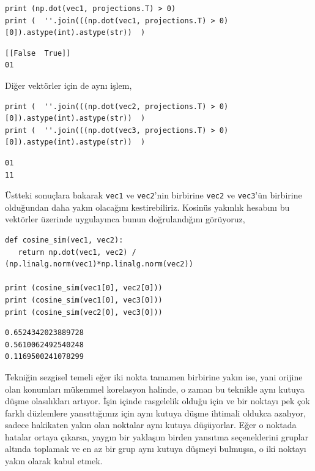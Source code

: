 \documentclass[12pt,fleqn]{article}\usepackage{../../common}
\begin{document}
\begin{verbatim}
print (np.dot(vec1, projections.T) > 0)
print (  ''.join(((np.dot(vec1, projections.T) > 0)[0]).astype(int).astype(str))  )
\end{verbatim}

\begin{verbatim}
[[False  True]]
01
\end{verbatim}

Diğer vektörler için de aynı işlem,

\begin{verbatim}
print (  ''.join(((np.dot(vec2, projections.T) > 0)[0]).astype(int).astype(str))  )
print (  ''.join(((np.dot(vec3, projections.T) > 0)[0]).astype(int).astype(str))  )
\end{verbatim}

\begin{verbatim}
01
11
\end{verbatim}

Üstteki sonuçlara bakarak \verb!vec1! ve \verb!vec2!'nin birbirine \verb!vec2! ve
\verb!vec3!'ün birbirine olduğundan daha yakın olacağını kestirebiliriz. Kosinüs
yakınlık hesabını bu vektörler üzerinde uygulayınca bunun doğrulandığını görüyoruz,

\begin{verbatim}
def cosine_sim(vec1, vec2):
   return np.dot(vec1, vec2) / (np.linalg.norm(vec1)*np.linalg.norm(vec2))

print (cosine_sim(vec1[0], vec2[0]))   
print (cosine_sim(vec1[0], vec3[0]))   
print (cosine_sim(vec2[0], vec3[0]))   
\end{verbatim}

\begin{verbatim}
0.6524342023889728
0.5610062492540248
0.1169500241078299
\end{verbatim}

Tekniğin sezgisel temeli eğer iki nokta tamamen birbirine yakın ise, yani
orijine olan konumları mükemmel korelasyon halinde, o zaman bu teknikle aynı
kutuya düşme olasılıkları artıyor. İşin içinde rasgelelik olduğu için ve bir
noktayı pek çok farklı düzlemlere yansıttığımız için aynı kutuya düşme ihtimali
oldukca azalıyor, sadece hakikaten yakın olan noktalar aynı kutuya
düşüyorlar. Eğer o noktada hatalar ortaya çıkarsa, yaygın bir yaklaşım birden
yansıtma seçeneklerini gruplar altında toplamak ve en az bir grup aynı kutuya
düşmeyi bulmuşsa, o iki noktayı yakın olarak kabul etmek.
\end{document}
